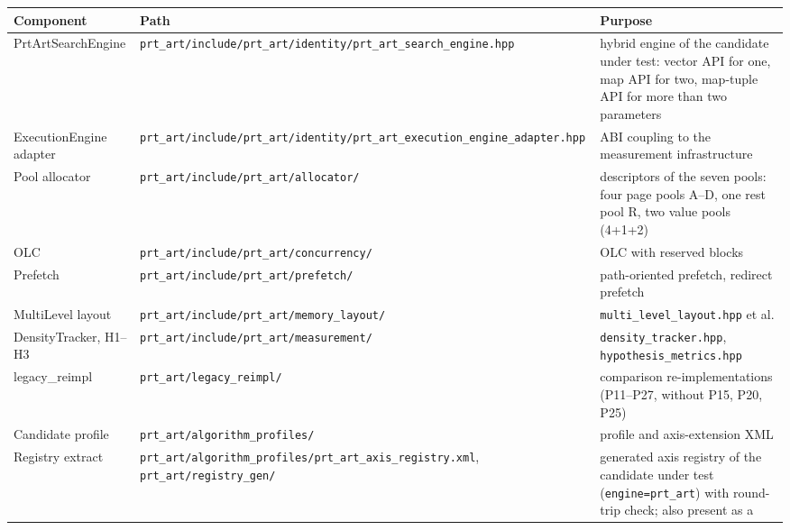 {\small
\begin{longtable}{@{}>{\raggedright\arraybackslash}p{}>{\raggedright\arraybackslash}p{}>{\raggedright\arraybackslash}p{}@{}}
\toprule
\textbf{Component} & \textbf{Path} & \textbf{Purpose} \\
\midrule
\endhead%
\midrule
\endfoot%
\bottomrule
\endlastfoot%
PrtArtSearchEngine &
\texttt{prt\_art/\allowbreak{}include/\allowbreak{}prt\_art/\allowbreak{}identity/\allowbreak{}prt\_art\_search\_engine.hpp} &
hybrid engine of the candidate under test: vector API for one, map API for two, map-tuple API for more than two
parameters \\
ExecutionEngine adapter &
\texttt{prt\_art/\allowbreak{}include/\allowbreak{}prt\_art/\allowbreak{}identity/\allowbreak{}prt\_\allowbreak{}art\_\allowbreak{}execution\_\allowbreak{}engine\_\allowbreak{}adapter.hpp} &
ABI coupling to the measurement infrastructure \\
Pool allocator &
\texttt{prt\_art/\allowbreak{}include/\allowbreak{}prt\_art/\allowbreak{}allocator/} &
descriptors of the seven pools: four page pools A--D, one rest pool R, two value pools (4+1+2) \\
OLC &
\texttt{prt\_art/\allowbreak{}include/\allowbreak{}prt\_art/\allowbreak{}concurrency/} &
OLC with reserved blocks \\
Prefetch &
\texttt{prt\_art/\allowbreak{}include/\allowbreak{}prt\_art/\allowbreak{}prefetch/} &
path-oriented prefetch, redirect prefetch \\
MultiLevel layout &
\texttt{prt\_art/\allowbreak{}include/\allowbreak{}prt\_art/\allowbreak{}memory\_layout/} &
\texttt{multi\_\allowbreak{}level\_\allowbreak{}layout.hpp} et al. \\
DensityTracker, H1--H3 &
\texttt{prt\_art/\allowbreak{}include/\allowbreak{}prt\_art/\allowbreak{}measurement/} &
\texttt{density\_\allowbreak{}tracker.hpp}, \texttt{hypothesis\_\allowbreak{}metrics.hpp} \\
legacy\_reimpl &
\texttt{prt\_art/\allowbreak{}legacy\_reimpl/} &
14 comparison re-implementations (P11--P27, without P15, P20, P25) \\
Candidate profile &
\texttt{prt\_art/\allowbreak{}algorithm\_profiles/} &
profile and axis-extension XML \\
Registry extract &
\texttt{prt\_art/\allowbreak{}algorithm\_profiles/\allowbreak{}prt\_art\_axis\_registry.xml},
\texttt{prt\_art/\allowbreak{}registry\_gen/} &
generated axis registry of the candidate under test (\texttt{engine=prt\_art}) with round-trip check; also present as a

\end{longtable}}
